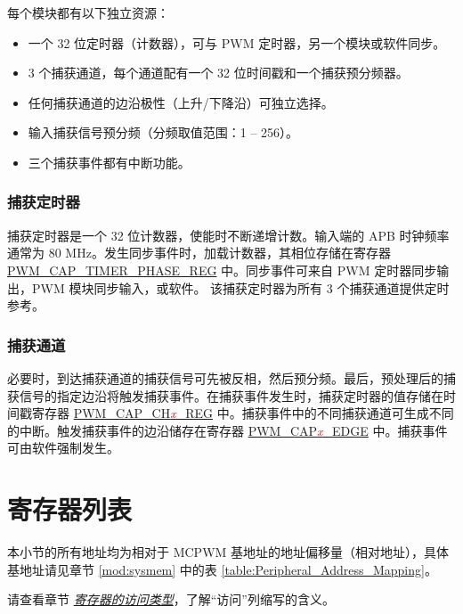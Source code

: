 \documentclass[main\_\_CN.tex]{subfiles}
\begin{document}
每个模块都有以下独立资源：
\begin{itemize}
    \item  一个 32 位定时器（计数器），可与 PWM 定时器，另一个模块或软件同步。
    \item 3 个捕获通道，每个通道配有一个 32 位时间戳和一个捕获预分频器。
    \item 任何捕获通道的边沿极性（上升/下降沿）可独立选择。
    \item 输入捕获信号预分频（分频取值范围：1 – 256）。
    \item 三个捕获事件都有中断功能。
\end{itemize}

\subsubsection{捕获定时器}
 捕获定时器是一个 32 位计数器，使能时不断递增计数。输入端的 APB 时钟频率通常为 80 MHz。发生同步事件时，加载计数器，其相位存储在寄存器 \hyperref[regdesc:PWMCAPTIMERPHASEREG]{PWM\_CAP\_TIMER\_PHASE\_REG} 中。同步事件可来自 PWM 定时器同步输出，PWM 模块同步输入，或软件。 该捕获定时器为所有 3 个捕获通道提供定时参考。

\subsubsection{捕获通道}

必要时，到达捕获通道的捕获信号可先被反相，然后预分频。最后，预处理后的捕获信号的指定边沿将触发捕获事件。在捕获事件发生时，捕获定时器的值存储在时间戳寄存器 \hyperref[regdesc:PWMCAPCH0REG]{PWM\_CAP\_CH\textcolor{red}{\it{x}}\_REG} 中。捕获事件中的不同捕获通道可生成不同的中断。触发捕获事件的边沿储存在寄存器 \hyperref[regdesc:PWMCAPSTATUSREG]{PWM\_CAP\textcolor{red}{\it{x}}\_EDGE} 中。捕获事件可由软件强制发生。



\hypertarget{mcpwm-reg-summ}{}
\section{寄存器列表}
\label{section:register_summary}

本小节的所有地址均为相对于 MCPWM 基地址的地址偏移量（相对地址），具体基地址请见章节 \ref{mod:sysmem} \textit{} 中的表 \ref{table:Peripheral_Address_Mapping}。

请查看章节 \hyperref[glossary-access-types]{\textit{寄存器的访问类型}}，了解“访问”列缩写的含义。


\end{document}
